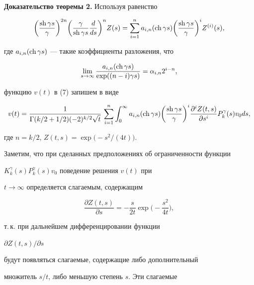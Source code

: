 {\bf Доказательство теоремы 2.} Используя равенство


$$


\bigg(\frac{\sh \gamma s}{\gamma}\bigg)^{2n}


\bigg(\frac{\gamma}{\sh \gamma s} \frac{d}{ds}\bigg)^n Z(s)=


\sum_{i=1}^n a_{i,n}(\ch \gamma s)


\bigg(\frac{\sh \gamma s}{\gamma}\bigg)^i Z^{(i)}(s),


$$


где $a_{i,n}(\operatorname{ch} \gamma s)$ --- такие коэффициенты разложения, что


$$


\lim_{s\to\infty}\frac{a_{i,n}(\ch \gamma s)}{\exp((n-i)\gamma s)}=


\alpha_{i,n} 2^{i-n},


$$


функцию $v(t)$ в (7) запишем в виде


\begin{equation}


v(t)=\frac{1}{\Gamma(k/2+1/2)(-2)^{k/2}\sqrt{t}}\,


\sum_{i=1}^n\int_0^\infty a_{i,n}(\ch \gamma s)


\bigg(\frac{\sh \gamma s}{\gamma}\bigg )^i \frac{\partial^{i}Z(t,s)}


{\partial s^i} P_k^\gamma(s)v_0 ds,


\end{equation}


где $n=k/2$, $Z(t,s)=\exp\big (-s^2/(4t)\big )$.





Заметим, что при сделанных предположениях об ограниченности функции


$K_k^\gamma(s)P_k^\gamma(s)v_0$ поведение решения $v(t)$ при


$t\to\infty$ определяется слагаемым, содержащим


$$


\frac{\partial Z(t,s)}{\partial s}=-\frac{s}{2t}


\exp\bigg (-\frac{s^2}{4t}\bigg),


$$


т.\,к. при дальнейшем дифференцировании функции


$\partial Z(t,s)/ \partial s$


будут появляться слагаемые, содержащие либо дополнительный


множитель $s/t$, либо меньшую степень $s$. Эти слагаемые


